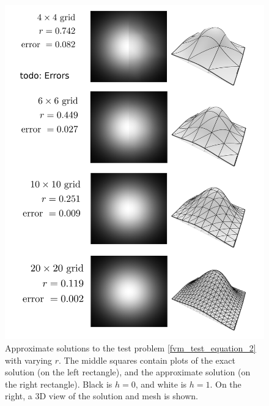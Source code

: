 \begin{figure}[H]
    \begin{center}
        \includegraphics[width=1\linewidth]{figures/quadratic_error/quadratic_error.png}
    \end{center}
    \caption{
        Approximate solutions to the test problem \eqref{fvm_test_equation_2} with varying $r$.
        The middle squares contain plots of the exact solution (on the left rectangle), and the approximate solution (on the right rectangle).
        Black is $h = 0$, and white is $h = 1$.
        On the right, a 3D view of the solution and mesh is shown.
    }
    \label{quadratic_fem_error_page}
\end{figure}


